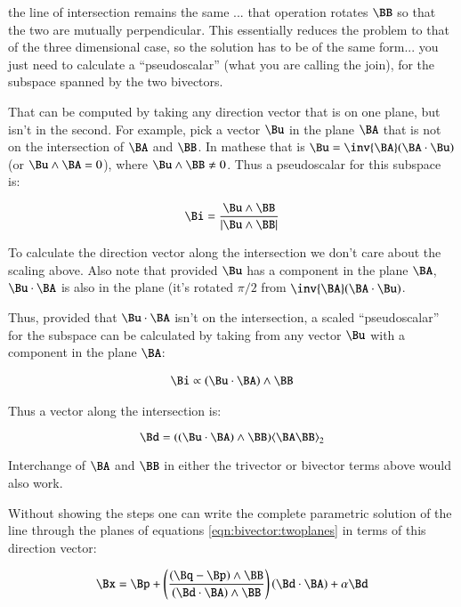 the line of intersection remains the same ... that operation rotates $\BB$ so that the two are mutually perpendicular.  This essentially reduces the problem to that of the three dimensional case, so the solution has to be of the same form... you just need to calculate a ``pseudoscalar'' (what you are calling the join), for the subspace spanned by the two bivectors.

That can be computed by taking any direction vector that is on one plane, but isn't in the second.  For example, pick a vector $\Bu$ in the plane $\BA$ that is not on the intersection of $\BA$ and $\BB$.  In mathese that is $\Bu = \inv{\BA}(\BA\cdot \Bu)$ (or $\Bu \wedge \BA = 0$), where $\Bu \wedge \BB \ne 0$.  Thus a pseudoscalar for this subspace is:

\begin{align*}
\Bi = \frac{\Bu \wedge \BB}{\Abs{\Bu \wedge \BB}}
\end{align*}

To calculate the direction vector along the intersection we don't care about the scaling above.  Also note that provided $\Bu$ has a component in the plane $\BA$, $\Bu \cdot \BA$ is also in the plane (it's rotated $\pi/2$ from $\inv{\BA}(\BA \cdot \Bu)$.

Thus, provided that $\Bu \cdot \BA$ isn't on the intersection, a scaled ``pseudoscalar''
for the subspace can be calculated by taking from any vector $\Bu$ with a component in the plane $\BA$:

\begin{align*}
\Bi \propto (\Bu \cdot \BA) \wedge \BB
\end{align*}

Thus a vector along the intersection is:

\begin{equation}
\label{eqn:bivector:pseudoscalarinter}
\Bd = ((\Bu \cdot \BA) \wedge \BB) \gpgradetwo{\BA\BB}
\end{equation}

Interchange of $\BA$ and $\BB$ in either the trivector or bivector terms above would also work.

Without showing the steps one can write the complete parametric solution of the line through the planes of equations \ref{eqn:bivector:twoplanes} in terms of this direction vector:

\begin{equation}
\label{eqn:bivector:finalsolnofRNplaneintersection}
\Bx = \Bp + \left(\frac{(\Bq - \Bp)\wedge \BB}{(\Bd \cdot \BA) \wedge \BB}\right) (\Bd \cdot \BA) + \alpha \Bd
\end{equation}

